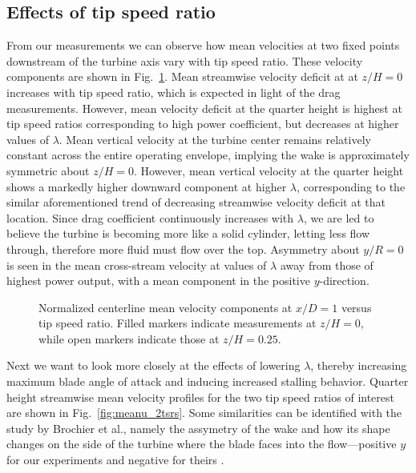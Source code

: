 

\subsection{Effects of tip speed ratio}

From our measurements we can observe how mean velocities at two fixed points
downstream of the turbine axis vary with tip speed ratio. These velocity
components are shown in Fig.~\ref{fig:meanuvstsr}. Mean streamwise velocity
deficit at at $z/H = 0$ increases with tip speed ratio, which is expected in
light of the drag measurements. However, mean velocity deficit at the quarter
height is highest at tip speed ratios corresponding to high power coefficient,
but decreases at higher values of $\lambda$. Mean vertical velocity at the
turbine center remains relatively constant across the entire operating envelope,
implying the wake is approximately symmetric about $z/H = 0$. However, mean
vertical velocity at the quarter height shows a markedly higher downward
component at higher $\lambda$, corresponding to the similar aforementioned trend
of decreasing streamwise velocity deficit at that location. Since drag
coefficient continuously increases with $\lambda$, we are led to believe the
turbine is becoming more like a solid cylinder, letting less flow through,
therefore more fluid must flow over the top. Asymmetry about $y/R=0$ is seen in
the mean cross-stream velocity at values of $\lambda$ away from those of highest
power output, with a mean component in the positive $y$-direction.

\begin{figure}[t]

    \caption{Normalized centerline mean velocity components at $x/D=1$ versus
        tip speed ratio. Filled markers indicate measurements at $z/H=0$, while open
        markers indicate those at $z/H=0.25$.}

    \label{fig:meanuvstsr} 
\end{figure}

Next we want to look more closely at the effects of lowering $\lambda$, thereby
increasing maximum blade angle of attack and inducing increased stalling
behavior. Quarter height streamwise mean velocity profiles for the two tip speed
ratios of interest are shown in Fig.~\ref{fig:meanu_2tsrs}. Some similarities
can be identified with the study by Brochier et al., namely the assymetry of the
wake and how its shape changes on the side of the turbine where the blade faces
into the flow---positive $y$ for our experiments and negative for theirs
\cite{brochier86}.

